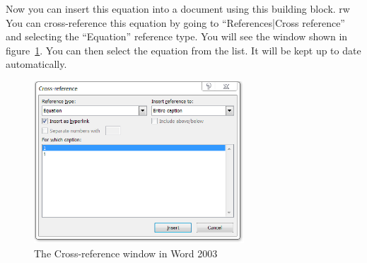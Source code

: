 \documentclass[a5paper, 10pt]{article}
\begin{document}
Now you can insert this equation into a document using this building block.
rw
You can cross-reference this equation by going to ``References|Cross reference'' and selecting the ``Equation'' reference type. 
You will see the window shown in figure~\ref{fig:wordcrossref}. 
You can then select the equation from the list. 
It will be kept up to date automatically.
\begin{figure}[htbp]
  \centering
  \includegraphics[width=0.7\textwidth]{crossreference}
  \caption{The Cross-reference window in Word 2003}
  \label{fig:wordcrossref}
\end{figure}
\end{document}
